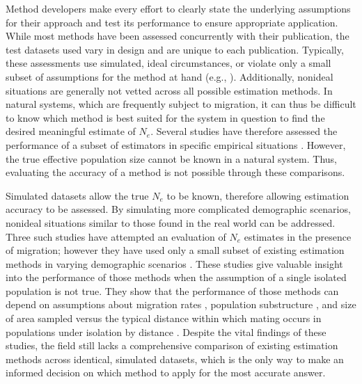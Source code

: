 Method developers make every effort to clearly state the underlying assumptions for their 
approach and test its performance to ensure appropriate application. While most methods have 
been assessed concurrently with their publication, the test datasets used vary in design and 
are unique to each publication. Typically, these assessments use simulated, ideal circumstances, 
or violate only a small subset of assumptions for the method at hand (e.g., \citealt{Vitalis:2001c, 
Beaumont:2003, Wang:2003, Anderson:2005, Wang:2009, Do:2014}). Additionally, 
nonideal situations are generally not vetted across all possible estimation methods. In natural 
systems, which are frequently subject to migration, it can thus be difficult to know which method 
is best suited for the system in question to find the desired meaningful estimate of $N_e$. 
Several studies have therefore assessed the performance of a subset of estimators in specific 
empirical situations \citep{Barker:2011, Serbezov:2012, Holleley:2013, Macbeth:2013, 
Baalsrud:2014}. However, the true effective population size cannot be known in a natural 
system. Thus, evaluating the accuracy of a method is not possible through these comparisons.

Simulated datasets allow the true $N_e$ to be known, therefore allowing estimation 
accuracy to be assessed. By simulating more complicated demographic scenarios, nonideal situations 
similar to those found in the real world can be addressed. Three such studies have attempted an 
evaluation of $N_e$ estimates in the presence of migration; however they have used only 
a small subset of existing estimation methods in varying demographic scenarios \citep{Waples:2011, Neel:2013, Ryman:2013}. 
These studies give valuable insight into the performance of those 
methods when the assumption of a single isolated population is not true. They show that the performance 
of those methods can depend on assumptions about migration rates \citep{Waples:2011}, population 
substructure \citep{Ryman:2013}, and size of area sampled versus the typical distance within which 
mating occurs in populations under isolation by distance \citep{Neel:2013}. Despite the vital 
findings of these studies, the field still lacks a comprehensive comparison of existing estimation 
methods across identical, simulated datasets, which is the only way to make an informed decision on 
which method to apply for the most accurate answer.

